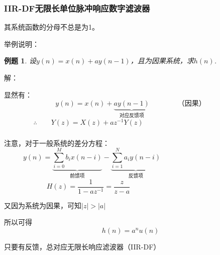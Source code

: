 \documentclass[notheorems,compress,mathserif,table]{beamer}
\newtheorem{example}{例题}
\begin{document}
\begin{frame}[shrink]\frametitle{IIR-DF无限长单位脉冲响应数字滤波器}%
\par 其系统函数的分母不总是为1。
\newline
\par 举例说明：
\begin{example}
\par 设$y(n)=x(n)+ay(n-1)$，且为因果系统，求$h(n)$.
\end{example}

\par 解：
\par 显然有：
$$y(n)=x(n)+\underbrace{ay(n-1)}_{\mbox{对应反馈项}}\quad\quad\quad\quad\mbox{（因果）}$$
$$\therefore \qquad Y(z) = X(z) + az^{-1}Y(z)\qquad\qquad\qquad\qquad\qquad\qquad$$
\end{frame}
\begin{frame}[shrink]\frametitle{}%
%
      注意，对于一般系统的差分方程：
      $$y(n)=\underbrace{\sum_{i=0}^{M}b_ix(n-i)}_{\mbox{前馈项}} - \underbrace{\sum_{i=1}^{N}a_iy(n-i)}_{\mbox{反馈项}}\quad\quad\quad\quad\quad\quad
      \quad\quad\quad\quad\quad$$
      $$H(z)=\frac{1}{1-az^{-1}}= \frac{z}{z-a}\quad\quad\quad\quad\quad\quad\quad\quad\quad\quad\quad\quad$$
      \par 又因为系统为因果，可知$|z|>|a|$
      \par 所以可得
      $$ h(n)=a^nu(n)$$

      \par 只要有反馈，总对应无限长响应滤波器（IIR-DF）
\end{frame}
\end{document}
